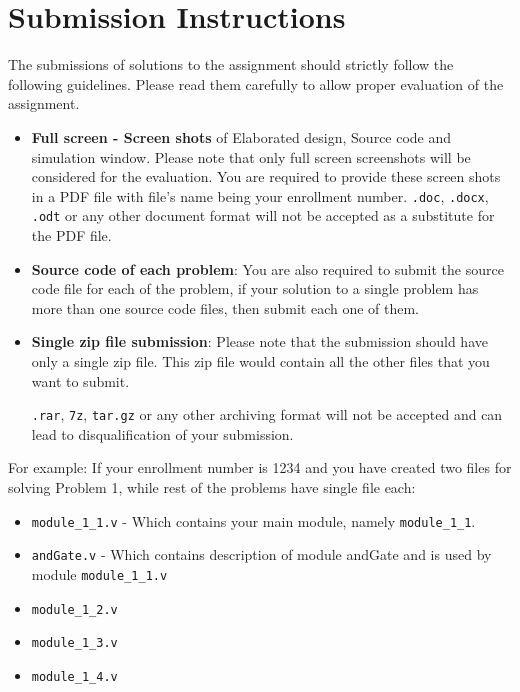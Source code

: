 \documentclass[a4paper,10pt]{article}
\newcommand{\ano}{\text{2}}
\theoremstyle{mytheor}
\newcommand{\inlinev}[1]{\lstinline[style=verilog-inline-style]{#1}}
\begin{document}
 \section*{Submission Instructions}
The submissions of solutions to the assignment {\ano} should strictly
follow the following guidelines. Please read them carefully to allow
proper evaluation of the assignment.

\begin{itemize}
\item \textbf{Full screen - Screen shots} of Elaborated design, Source
  code and simulation window. Please note that only full screen
  screenshots will be considered for the evaluation. You are required
  to provide these screen shots in a PDF file with file's name being
  your enrollment
  number. \inlinev{.doc},
  \inlinev{.docx},
  \inlinev{.odt} or any other document
  format will {\color{red}not} be accepted as a substitute for the PDF
  file.

\item \textbf{Source code of each problem}: You are also required to submit
the source code file for each of the problem, if your solution to a
single problem has more than one source code files, then submit each
one of them.

\item \textbf{Single zip file submission}: Please note that the
  submission should have only a single {\color{blue}zip} file. This
  zip file would contain all the other files that you want to submit.

  \inlinev{.rar},
  \inlinev{7z},
  \inlinev{tar.gz} or any other
  archiving format will {\color{red}not} be accepted and can lead to
  disqualification of your submission.
  
\end{itemize} 

{\color{blue}For example}: If your enrollment number is 1234 and you
have created two files for solving Problem 1, while rest of the
problems have single file each:

\begin{itemize}
\item \inlinev{module_1_1.v} - Which
  contains your main module, namely
  \inlinev{module_1_1}.
\item \inlinev{andGate.v} - Which
  contains description of module andGate and is used by module
  \inlinev{module_1_1.v}
\item \inlinev{module_1_2.v}
\item \inlinev{module_1_3.v}
\item \inlinev{module_1_4.v}
\end{itemize}
\end{document}
